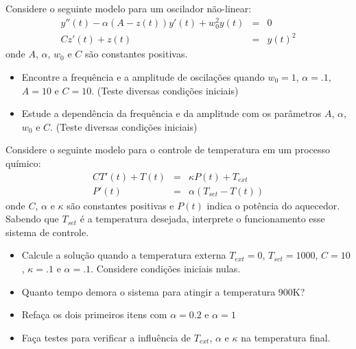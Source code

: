 \begin{exer} Considere o seguinte modelo para um oscilador não-linear:
\begin{eqnarray*}
y''(t)-\alpha(A-z(t))y'(t)+w_0^2 y(t)&=&0\\
Cz'(t)+z(t)&=&y(t)^2
\end{eqnarray*}
onde $A$, $\alpha$, $w_0$ e $C$ são constantes positivas.
\begin{itemize}
\item Encontre a frequência e a amplitude de oscilações quando $w_0=1$, $\alpha=.1$, $A=10$ e $C=10$. (Teste diversas condições iniciais)
\item Estude a dependência da frequência e da amplitude com os parâmetros  $A$, $\alpha$, $w_0$ e $C$. (Teste diversas condições iniciais)
\end{itemize}
\end{exer}

\begin{exer} Considere o seguinte modelo para o controle de temperatura em um processo químico:
\begin{eqnarray*}
CT'(t)+T(t)&=&\kappa P(t)+T_{ext}\\
P'(t)&=&\alpha(T_{set}-T(t))
\end{eqnarray*}
onde $C$, $\alpha$ e $\kappa$ são constantes positivas e $P(t)$ indica o potência do aquecedor. Sabendo que $T_{set}$ é a temperatura desejada, interprete o funcionamento esse sistema de controle.
\begin{itemize}
\item Calcule a solução quando a temperatura externa $T_{ext}=0$, $T_{set}=1000$, $C=10$, $\kappa=.1$ e $\alpha=.1$. Considere condições iniciais nulas.
\item Quanto tempo demora o sistema para atingir a temperatura 900K?
\item Refaça os dois primeiros itens com $\alpha=0.2$ e $\alpha=1$
\item Faça testes para verificar a influência de $T_{ext}$, $\alpha$ e $\kappa$ na temperatura final.
\end{itemize}
\end{exer}

